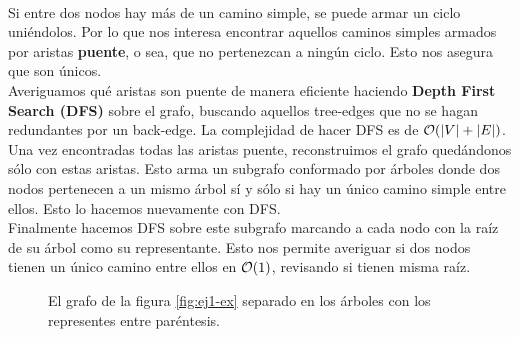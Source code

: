 \documentclass[../main.tex]{subfiles}
\begin{document}
\paragraph{} Si entre dos nodos hay más de un camino simple, se puede armar un ciclo uniéndolos. Por lo que nos interesa encontrar aquellos caminos simples armados por aristas \textbf{puente}, o sea, que no pertenezcan a ningún ciclo. Esto nos asegura que son únicos. \\
Averiguamos qué aristas son puente de manera eficiente haciendo \textbf{Depth First Search (DFS)} sobre el grafo, buscando aquellos tree-edges que no se hagan redundantes por un back-edge. La complejidad de hacer DFS es de \(\mathcal{O}(|V| + |E|)\). \\
Una vez encontradas todas las aristas puente, reconstruimos el grafo quedándonos sólo con estas aristas. Esto arma un subgrafo conformado por árboles donde dos nodos pertenecen a un mismo árbol sí y sólo si hay un único camino simple entre ellos. Esto lo hacemos nuevamente con DFS. \\
Finalmente hacemos DFS sobre este subgrafo marcando a cada nodo con la raíz de su árbol como su representante. Esto nos permite averiguar si dos nodos tienen un único camino entre ellos en \(\mathcal{O}(1)\), revisando si tienen misma raíz.

\begin{figure}[H]
\centering

  
\caption{El grafo de la figura \ref{fig:ej1-ex} separado en los árboles con los representes entre paréntesis.}
\label{fig:ej1-res}
\end{figure}
\end{document}
